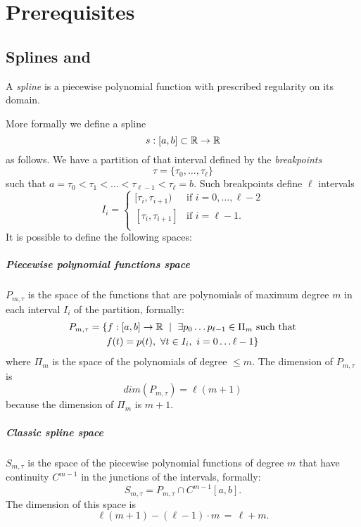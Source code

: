 \documentclass[dissertation.tex]{subfiles}
\begin{document}
\chapter{Prerequisites}\label{cha:prerequisites}
\section{Splines and \bss}\label{sec:spline}
A \emph{spline} is a piecewise polynomial function with prescribed
regularity on its domain.

More formally we define a spline \cite{deboor}\cite{farin}\cite{salomon}\cite{bartels}
$$s:[a,b]\subset\mathbb{R}\rightarrow\mathbb{R}$$
as follows.
We have a partition of that interval defined by the \emph{breakpoints}
$$\tau = \{\tau_0,\dots,\tau_\ell\}$$
such that $a=\tau_0<\tau_1<\dots<\tau_{\ell-1}<\tau_\ell=b$. Such
breakpoints define $\ell$ intervals
$$
I_i=
\begin{cases}
  [\tau_i,\tau_{i+1}) & \mbox{if } i=0,\dots,\ell-2\\
    [\tau_i,\tau_{i+1}] & \mbox{if } i=\ell-1.\\
\end{cases}
$$
It is possible to define the following spaces:
\paragraph{Piecewise polynomial functions space} $P_{m,\tau}$
is the space of the functions that are polynomials of maximum degree $m$
in each interval $I_i$ of the partition, formally:
\begin{multline*}
  P_{m,\tau}=\{f:[a,b]\rightarrow\mathbb{R}\ \mid\ \exists p_0\dots
  p_{\ell-1}\in\Pi_m \ \text{such that}\\
  f(t)=p(t),\ \forall t\in I_i,\
  i=0\dots \ell-1\}
\end{multline*}
where $\Pi_m$ is the space of the polynomials of degree $\le m$. The
dimension of $P_{m,\tau}$ is
\begin{equation*}
  dim(P_{m,\tau})=\ell(m+1)
\end{equation*}
because the dimension of $\Pi_m$
is $m+1$.
\paragraph{Classic spline space} $S_{m,\tau}$ is the space of
the piecewise polynomial functions of degree $m$ that have continuity
$C^{m-1}$ in
the junctions of the intervals, formally:
$$
S_{m,\tau}=P_{m,\tau}\cap C^{m-1}[a,b].
$$
The dimension of this space is
\begin{equation}
  \label{eq:dimClassicSpline}
  \ell(m+1)-(\ell-1)\cdot m\,=\,\ell+m.
\end{equation}
\end{document}
